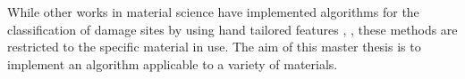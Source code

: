 

While other works in material science have implemented algorithms for the classification of damage sites by using hand tailored features \cite{Chen2013}, \cite{Zapata2011}, these methods are restricted to the specific material in use. The aim of this master thesis is to implement an algorithm applicable to a variety of materials. \\



